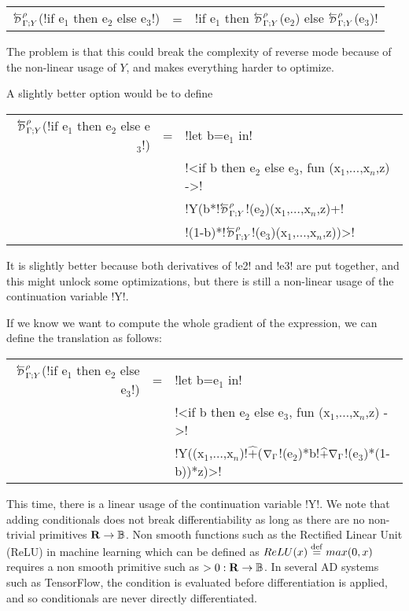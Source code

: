 \begin{tabular}{r c l}
$\directD{\rho}{\Gamma}{Y}$(!if e$_1$ then e$_2$ else e$_3$!) &=& !if e$_1$ then $\directD{\rho}{\Gamma}{Y}$(e$_2$) else $\directD{\rho}{\Gamma}{Y}$(e$_3$)! 
\end{tabular}

The problem is that this could break the complexity of reverse mode because of the non-linear usage of $Y$, and makes everything harder to optimize.

A slightly better option would be to define 

\begin{tabular}{r c l}
    $\directD{\rho}{\Gamma}{Y}$(!if e$_1$ then e$_2$ else e$_3$!) 
    &=& !let b=e$_1$ in!   \\
    && !<if b then e$_2$ else e$_3$, fun (x$_1$,$\ldots$,x$_n$,z) ->! \\
    && !Y(b*!$\directD{\rho}{\Gamma}{Y}$!(e$_2$)(x$_1$,$\ldots$,x$_n$,z)+!\\
    && \quad!(1-b)*!$\directD{\rho}{\Gamma}{Y}$!(e$_3$)(x$_1$,$\ldots$,x$_n$,z))>!
\end{tabular}

It is slightly better because both derivatives of !e2! and !e3! are put together, and this might unlock some optimizations, 
but there is still a non-linear usage of the continuation variable !Y!.

If we know we want to compute the whole gradient of the expression, we can define the translation as follows:

\begin{tabular}{r c l}
    $\directD{\rho}{\Gamma}{Y}$(!if e$_1$ then e$_2$ else e$_3$!) 
    &=& !let b=e$_1$ in!   \\
    && !<if b then e$_2$ else e$_3$, fun (x$_1$,$\ldots$,x$_n$,z) ->! \\
    && !Y((x$_1$,$\ldots$,x$_n$)!$\widehat{+}$($\nabla_\Gamma$!(e$_2$)*b!$\widehat{+}\nabla_\Gamma$!(e$_3$)*(1-b))*z)>!\\
\end{tabular}

This time, there is a linear usage of the continuation variable !Y!. We note that adding conditionals does not break differentiability as long as there are no non-trivial primitives $\mathbf{R}\to\mathbb{B}$.
Non smooth functions such as the Rectified Linear Unit (ReLU) in machine learning which can be defined as $ReLU(x)\stackrel {\mathrm{def}}= max(0,x)$ 
requires a non smooth primitive such as $>0: \mathbf{R}\to\mathbb{B}$. In several AD systems such as TensorFlow, 
the condition is evaluated before differentiation is applied, and so conditionals are never directly differentiated.

